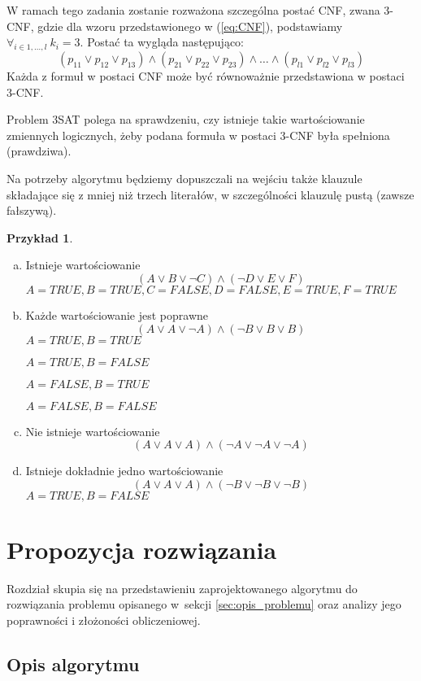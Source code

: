 \documentclass[a4paper,10pt,twoside]{report}
\theoremstyle{definition}
\newtheorem{example}[theorem]{Przykład}
\begin{document}
W ramach tego zadania zostanie rozważona szczególna postać CNF, zwana 3-CNF, gdzie dla wzoru przedstawionego w (\ref{eq:CNF}), podstawiamy $\forall_{i\in {1, \dots , l }}\ k_i = 3$. Postać ta wygląda następująco:
\begin{equation}
\label{eq:3CNF}
(p_{11} \lor p_{12} \lor p_{13})\land (p_{21} \lor p_{22} \lor p_{23})\land\dots\land (p_{l1} \lor p_{l2} \lor p_{l3})
\end{equation}
Każda z formuł w postaci CNF może być równoważnie przedstawiona w postaci 3-CNF.

Problem 3SAT polega na sprawdzeniu, czy istnieje takie wartościowanie zmiennych logicznych, żeby podana formuła w postaci 3-CNF była spełniona (prawdziwa).

Na potrzeby algorytmu będziemy dopuszczali na wejściu także klauzule składające się z mniej niż trzech literałów, w szczególności klauzulę pustą (zawsze fałszywą).

\begin{example} \hfill
\begin{enumerate}[(a)]
    \item Istnieje wartościowanie
    $$(A\lor B\lor\lnot C)\land (\lnot D\lor E\lor F)$$
    $A=TRUE, B=TRUE, C=FALSE, D=FALSE, E=TRUE, F=TRUE$
    \item Każde wartościowanie jest poprawne
    $$(A\lor A\lor\lnot A)\land (\lnot B\lor B\lor B)$$
    $A=TRUE, B=TRUE$
    
    $A=TRUE, B=FALSE$

    $A=FALSE, B=TRUE$
    
    $A=FALSE, B=FALSE$
    \item Nie istnieje wartościowanie
    $$(A\lor A\lor A)\land (\lnot A\lor \lnot A\lor \lnot A)$$
    \item Istnieje dokładnie jedno wartościowanie
    $$(A\lor A\lor A)\land (\lnot B\lor\lnot B\lor\lnot B)$$
    $A=TRUE, B=FALSE$
\end{enumerate}
\end{example}


\chapter{Propozycja rozwiązania}

Rozdział skupia się na przedstawieniu zaprojektowanego algorytmu do rozwiązania problemu opisanego w~sekcji \ref{sec:opis_problemu} oraz analizy jego poprawności i złożoności obliczeniowej.

\section{Opis algorytmu}\label{sec:algorytm}
\end{document}
